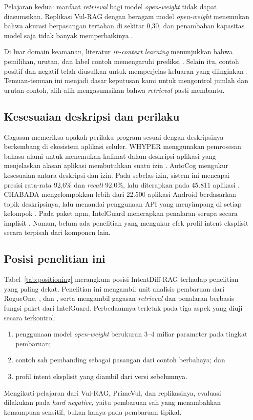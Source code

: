 \documentclass[a4paper,fleqn]{cas-dc}
\begin{document}
Pelajaran kedua: manfaat \emph{retrieval} bagi model \emph{open-weight} tidak
dapat diasumsikan. Replikasi Vul-RAG dengan beragam model \emph{open-weight}
menemukan bahwa akurasi berpasangan tertahan di sekitar 0,30, dan penambahan
kapasitas model saja tidak banyak memperbaikinya \citep{kaniewski2026revisiting}.

Di luar domain keamanan, literatur \emph{in-context learning} menunjukkan bahwa
pemilihan, urutan, dan label contoh memengaruhi prediksi
\citep{liu2022makes,zhao2021calibrate,min2022rethinking}. Selain itu, contoh
positif dan negatif telah diusulkan untuk memperjelas keluaran yang diinginkan
\citep{gao2024customizing}. Temuan-temuan ini menjadi dasar keputusan kami untuk
mengontrol jumlah dan urutan contoh, alih-alih mengasumsikan bahwa
\emph{retrieval} pasti membantu.

\subsection{Kesesuaian deskripsi dan perilaku}

Gagasan memeriksa apakah perilaku program sesuai dengan deskripsinya berkembang
di ekosistem aplikasi seluler. WHYPER menggunakan pemrosesan bahasa alami untuk
menemukan kalimat dalam deskripsi aplikasi yang menjelaskan alasan aplikasi
membutuhkan suatu izin \citep{pandita2013whyper}. AutoCog mengukur kesesuaian
antara deskripsi dan izin. Pada sebelas izin, sistem ini mencapai presisi
rata-rata 92,6\% dan \emph{recall} 92,0\%, lalu diterapkan pada 45.811 aplikasi
\citep{qu2014autocog}. CHABADA mengelompokkan lebih dari 22.500 aplikasi Android
berdasarkan topik deskripsinya, lalu menandai penggunaan API yang menyimpang di
setiap kelompok \citep{gorla2014checking}. Pada paket npm, IntelGuard menerapkan
penalaran serupa secara implisit \citep{guo2026bridging}. Namun, belum ada
penelitian yang mengukur efek profil intent eksplisit secara terpisah dari
komponen lain.

\subsection{Posisi penelitian ini}

Tabel~\ref{tab:positioning} merangkum posisi IntentDiff-RAG terhadap penelitian
yang paling dekat. Penelitian ini mengambil unit analisis pembaruan dari RogueOne,
\citet{froh2023differential}, dan \citet{wyss2025evaluating}, serta mengambil
gagasan \emph{retrieval} dan penalaran berbasis fungsi paket dari IntelGuard.
Perbedaannya terletak pada tiga aspek yang diuji secara terkontrol:
\begin{enumerate}
  \item penggunaan model \emph{open-weight} berukuran 3--4 miliar parameter pada
  tingkat pembaruan;
  \item contoh sah pembanding sebagai pasangan dari contoh berbahaya; dan
  \item profil intent eksplisit yang diambil dari versi sebelumnya.
\end{enumerate}
Mengikuti pelajaran dari Vul-RAG, PrimeVul, dan replikasinya, evaluasi dilakukan
pada \emph{hard negative}, yaitu pembaruan sah yang menambahkan kemampuan
sensitif, bukan hanya pada pembaruan tipikal.
\end{document}
